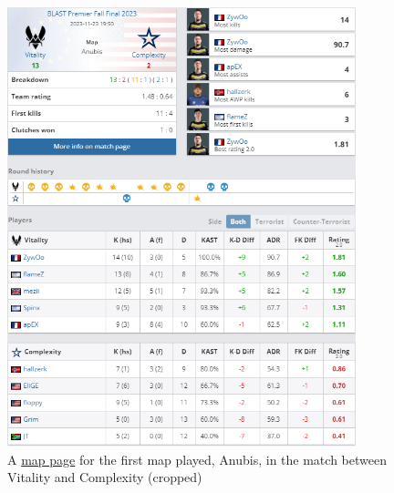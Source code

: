 \begin{figure}[h!]
	\centering
	\includegraphics[width=0.9\textwidth]{Figures/hltv/map-cropped-2.png}
	\caption{A \href{https://www.hltv.org/stats/matches/mapstatsid/167162/complexity-vs-vitality}{map page} for the first map played, Anubis, in the match between Vitality and Complexity (cropped)}
	\label{fig:map_cropped}
\end{figure}

\clearpage

